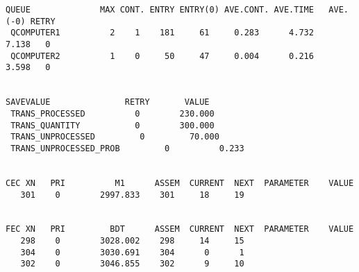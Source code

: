 \begin{lstlisting}[caption={отчет}]
QUEUE              MAX CONT. ENTRY ENTRY(0) AVE.CONT. AVE.TIME   AVE.(-0) RETRY
 QCOMPUTER1          2    1    181     61     0.283      4.732      7.138   0
 QCOMPUTER2          1    0     50     47     0.004      0.216      3.598   0


SAVEVALUE               RETRY       VALUE
 TRANS_PROCESSED          0        230.000                            
 TRANS_QUANTITY           0        300.000                            
 TRANS_UNPROCESSED         0         70.000                            
 TRANS_UNPROCESSED_PROB         0          0.233                            


CEC XN   PRI          M1      ASSEM  CURRENT  NEXT  PARAMETER    VALUE
   301    0        2997.833    301     18     19


FEC XN   PRI         BDT      ASSEM  CURRENT  NEXT  PARAMETER    VALUE
   298    0        3028.002    298     14     15
   304    0        3030.691    304      0      1
   302    0        3046.855    302      9     10
\end{lstlisting}
